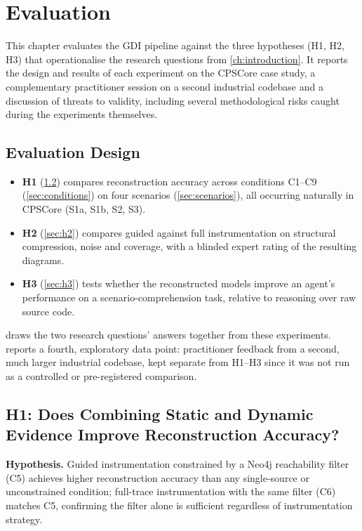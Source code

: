\chapter{Evaluation}\label{ch:analysis}

This chapter evaluates the \ac{GDI} pipeline against the three hypotheses
(H1, H2, H3) that operationalise the research questions from
\cref{ch:introduction}. It reports the design and results of each
experiment on the CPSCore case study, a complementary practitioner
session on a second industrial codebase and a discussion of threats to
validity, including several methodological risks caught during the
experiments themselves.

\section{Evaluation Design}\label{sec:eval-design}

\begin{itemize}
  \item \textbf{H1} (\cref{sec:h1}) compares reconstruction accuracy
    across conditions C1--C9 (\cref{sec:conditions}) on four scenarios
    (\cref{sec:scenarios}), all occurring naturally in CPSCore (S1a, S1b,
    S2, S3).
  \item \textbf{H2} (\cref{sec:h2}) compares guided against full
    instrumentation on structural compression, noise and coverage, with a
    blinded expert rating of the resulting diagrams.
  \item \textbf{H3} (\cref{sec:h3}) tests whether the reconstructed models
    improve an agent's performance on a scenario-comprehension task,
    relative to reasoning over raw source code.
\end{itemize}

 draws the two research questions' answers together
from these experiments.
 reports a fourth, exploratory data point:
practitioner feedback from a second, much larger industrial codebase,
kept separate from H1--H3 since it was not run as a controlled or
pre-registered comparison.

\section{H1: Does Combining Static and Dynamic Evidence Improve Reconstruction Accuracy?}\label{sec:h1}

\textbf{Hypothesis.} Guided instrumentation constrained by a Neo4j
reachability filter (C5) achieves higher reconstruction accuracy than any
single-source or unconstrained condition; full-trace instrumentation with
the same filter (C6) matches C5, confirming the filter alone is
sufficient regardless of instrumentation strategy.

